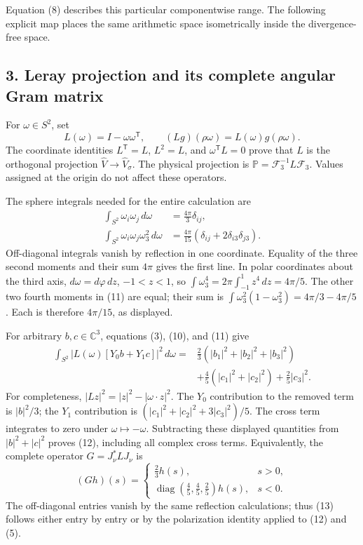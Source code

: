 Equation (8) describes this particular componentwise range. The following explicit map places the same arithmetic space isometrically inside the divergence-free space.

\subsection*{3. Leray projection and its complete angular Gram matrix}

For \(\omega\in S^2\), set \[
L(\omega)=I-\omega\omega^{\mathsf T},\qquad
(Lg)(\rho\omega)=L(\omega)g(\rho\omega).
\tag{10}
\] The coordinate identities \(L^{\mathsf T}=L\), \(L^2=L\), and \(\omega^{\mathsf T}L=0\) prove that \(L\) is the orthogonal projection \(\widehat V\to\widehat V_\sigma\). The physical projection is \(\mathbb P=\mathcal F_3^{-1}L\mathcal F_3\). Values assigned at the origin do not affect these operators.

The sphere integrals needed for the entire calculation are \[
\begin{aligned}
\int_{S^2}\omega_i\omega_j\,d\omega&=\frac{4\pi}{3}\delta_{ij},\\
\int_{S^2}\omega_i\omega_j\omega_3^2\,d\omega
&=\frac{4\pi}{15}(\delta_{ij}+2\delta_{i3}\delta_{j3}).
\end{aligned}
\tag{11}
\] Off-diagonal integrals vanish by reflection in one coordinate. Equality of the three second moments and their sum \(4\pi\) gives the first line. In polar coordinates about the third axis, \(d\omega=d\varphi\,dz\), \(-1<z<1\), so \(\int\omega_3^4=2\pi\int_{-1}^1z^4\,dz=4\pi/5\). The other two fourth moments in (11) are equal; their sum is \(\int\omega_3^2(1-\omega_3^2)=4\pi/3-4\pi/5\). Each is therefore \(4\pi/15\), as displayed.

For arbitrary \(b,c\in\mathbb C^3\), equations (3), (10), and (11) give \[
\begin{aligned}
\int_{S^2}|L(\omega)[Y_0b+Y_1c]|^2\,d\omega
={}&\frac23(|b_1|^2+|b_2|^2+|b_3|^2)\\
&+\frac45(|c_1|^2+|c_2|^2)+\frac25|c_3|^2.
\end{aligned}
\tag{12}
\] For completeness, \(|Lz|^2=|z|^2-|\omega\cdot z|^2\). The \(Y_0\) contribution to the removed term is \(|b|^2/3\); the \(Y_1\) contribution is \((|c_1|^2+|c_2|^2+3|c_3|^2)/5\). The cross term integrates to zero under \(\omega\mapsto-\omega\). Subtracting these displayed quantities from \(|b|^2+|c|^2\) proves (12), including all complex cross terms. Equivalently, the complete operator \(G=J_\nu^*LJ_\nu\) is \[
(Gh)(s)=
\begin{cases}
\frac23 h(s),&s>0,\\
\operatorname{diag}(\frac45,\frac45,\frac25)h(s),&s<0.
\end{cases}
\tag{13}
\] The off-diagonal entries vanish by the same reflection calculations; thus (13) follows either entry by entry or by the polarization identity applied to (12) and (5).

